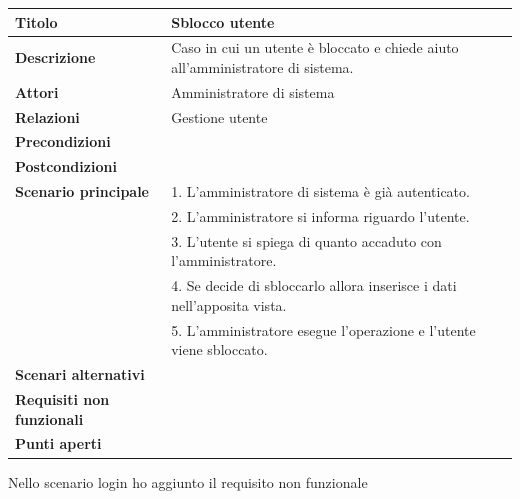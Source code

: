 \documentclass[a4paper]{article}
\begin{document}
\begin{center}
    \begin{tabularx}{1\textwidth}{|l|X|}
        \hline
        \textbf{Titolo} & Sblocco utente \\
        \hline
        \textbf{Descrizione} & Caso in cui un utente è bloccato e chiede aiuto all'amministratore di sistema. \\
        \hline
        \textbf{Attori} & Amministratore di sistema \\
        \hline
        \textbf{Relazioni} & Gestione utente \\
        \hline
        \textbf{Precondizioni} &  \\
        \hline
        \textbf{Postcondizioni} &  \\
        \hline
        \textbf{Scenario principale} & 1. L'amministratore di sistema è già autenticato.\\
                                     & 2. L'amministratore si informa riguardo l'utente.\\
                                     & 3. L'utente si spiega di quanto accaduto con l'amministratore.\\
                                     & 4. Se decide di sbloccarlo allora inserisce i dati nell'apposita vista.\\
                                     & 5. L'amministratore esegue l'operazione e l'utente viene sbloccato.\\
        \hline
        \textbf{Scenari alternativi} & \\
        \hline
        \textbf{Requisiti non funzionali} & \\
        \hline
        \textbf{Punti aperti} & \\
        \hline
    \end{tabularx}
\end{center}

Nello scenario login ho aggiunto il requisito non funzionale
\end{document}
